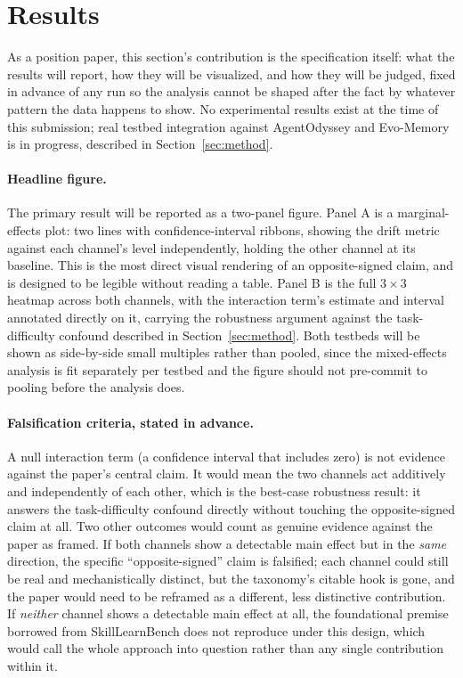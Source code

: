 \documentclass{article}
\begin{document}
\section{Results}
\label{sec:results}

As a position paper, this section's contribution is the specification itself: what the results will report, how they will be visualized, and how they will be judged, fixed in advance of any run so the analysis cannot be shaped after the fact by whatever pattern the data happens to show. No experimental results exist at the time of this submission; real testbed integration against AgentOdyssey and Evo-Memory is in progress, described in Section~\ref{sec:method}.

\paragraph{Headline figure.} The primary result will be reported as a two-panel figure. Panel A is a marginal-effects plot: two lines with confidence-interval ribbons, showing the drift metric against each channel's level independently, holding the other channel at its baseline. This is the most direct visual rendering of an opposite-signed claim, and is designed to be legible without reading a table. Panel B is the full $3\times3$ heatmap across both channels, with the interaction term's estimate and interval annotated directly on it, carrying the robustness argument against the task-difficulty confound described in Section~\ref{sec:method}. Both testbeds will be shown as side-by-side small multiples rather than pooled, since the mixed-effects analysis is fit separately per testbed and the figure should not pre-commit to pooling before the analysis does.

\paragraph{Falsification criteria, stated in advance.} A null interaction term (a confidence interval that includes zero) is not evidence against the paper's central claim. It would mean the two channels act additively and independently of each other, which is the best-case robustness result: it answers the task-difficulty confound directly without touching the opposite-signed claim at all. Two other outcomes would count as genuine evidence against the paper as framed. If both channels show a detectable main effect but in the \emph{same} direction, the specific ``opposite-signed'' claim is falsified; each channel could still be real and mechanistically distinct, but the taxonomy's citable hook is gone, and the paper would need to be reframed as a different, less distinctive contribution. If \emph{neither} channel shows a detectable main effect at all, the foundational premise borrowed from SkillLearnBench does not reproduce under this design, which would call the whole approach into question rather than any single contribution within it.
\end{document}
